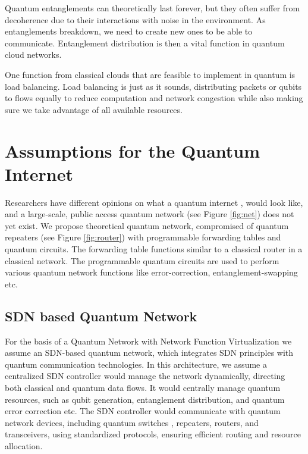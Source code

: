 \documentclass[sigplan,screen]{acmart}
\begin{document}
Quantum entanglements can theoretically last forever, but they often suffer from decoherence due to their interactions with noise in the environment. 
As entanglements breakdown, we need to create new ones to be able to communicate.
Entanglement distribution is then a vital function in quantum cloud networks.

One function from classical clouds that are feasible to implement in quantum is load balancing. 
Load balancing is just as it sounds, distributing packets or qubits to flows equally to reduce computation and network congestion while also making sure we take advantage of all available resources.




\section{Assumptions for the Quantum Internet}
Researchers have different opinions on what a quantum internet \cite{Kimble_2008}, \cite{quantum_internet} would look like, and a large-scale, public access quantum network (see Figure \ref{fig:net}) does not yet exist. We propose theoretical quantum network, compromised of quantum repeaters (see Figure \ref{fig:router}) with programmable forwarding tables and quantum circuits. The forwarding table functions similar to a classical router in a classical network. The programmable quantum circuits are used to perform various quantum network functions like error-correction, entanglement-swapping etc. 

\subsection{SDN based Quantum Network}
For the basis of a Quantum Network with Network Function Virtualization we assume an SDN-based quantum network, which integrates SDN principles with quantum communication technologies. In this architecture, we assume a centralized SDN controller would manage the network dynamically, directing both classical and quantum data flows. It would centrally manage quantum resources, such as qubit generation, entanglement distribution, and quantum error correction etc. The SDN controller would communicate with quantum network devices, including quantum switches \cite{quantumswitch_sdn}, repeaters, routers, and transceivers, using standardized protocols, ensuring efficient routing and resource allocation. 
\end{document}
